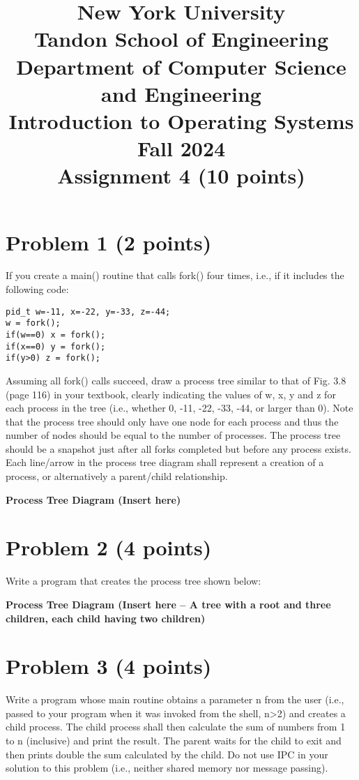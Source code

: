 \documentclass{article}
\title{New York University \\ Tandon School of Engineering \\ Department of Computer Science and Engineering \\ Introduction to Operating Systems \\ Fall 2024 \\ Assignment 4 (10 points)}
\author{}
\date{}
\begin{document}
\maketitle

\section*{Problem 1 (2 points)}

If you create a main() routine that calls fork() four times, i.e., if it includes the following code:

\begin{verbatim}
pid_t w=-11, x=-22, y=-33, z=-44;
w = fork();
if(w==0) x = fork();
if(x==0) y = fork();
if(y>0) z = fork();
\end{verbatim}

Assuming all fork() calls succeed, draw a process tree similar to that of Fig. 3.8 (page 116) in your textbook, clearly indicating the values of w, x, y and z for each process in the tree (i.e., whether 0, -11, -22, -33, -44, or larger than 0). Note that the process tree should only have one node for each process and thus the number of nodes should be equal to the number of processes. The process tree should be a snapshot just after all forks completed but before any process exists. Each line/arrow in the process tree diagram shall represent a creation of a process, or alternatively a parent/child relationship.

\textbf{Process Tree Diagram (Insert here)}


\section*{Problem 2 (4 points)}

Write a program that creates the process tree shown below:

\textbf{Process Tree Diagram (Insert here --  A tree with a root and three children, each child having two children)}


\section*{Problem 3 (4 points)}

Write a program whose main routine obtains a parameter n from the user (i.e., passed to your program when it was invoked from the shell, n>2) and creates a child process. The child process shall then calculate the sum of numbers from 1 to n (inclusive) and print the result.  The parent waits for the child to exit and then prints double the sum calculated by the child. Do not use IPC in your solution to this problem (i.e., neither shared memory nor message passing).
\end{document}
